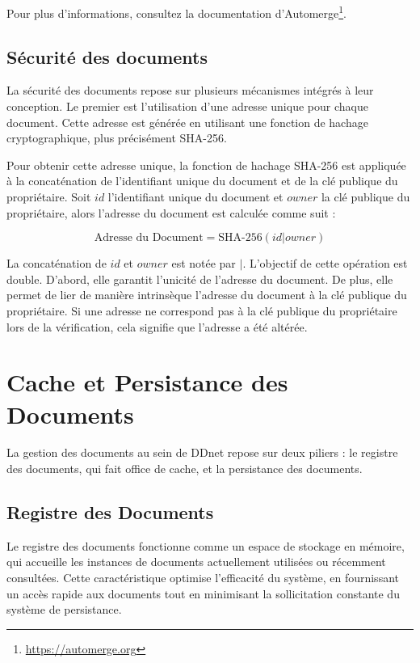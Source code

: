 Pour plus d'informations, consultez la documentation d'Automerge\footnote{\url{https://automerge.org}}.


\subsection{Sécurité des documents}

La sécurité des documents repose sur plusieurs mécanismes intégrés à leur conception. Le premier est l'utilisation d'une adresse unique pour chaque document. Cette adresse est générée en utilisant une fonction de hachage cryptographique, plus précisément SHA-256.

Pour obtenir cette adresse unique, la fonction de hachage SHA-256 est appliquée à la concaténation de l'identifiant unique du document et de la clé publique du propriétaire. Soit $id$ l'identifiant unique du document et $owner$ la clé publique du propriétaire, alors l'adresse du document est calculée comme suit :

\begin{equation}
    \text{Adresse du Document} = \text{SHA-256}(id | owner)
\end{equation}

La concaténation de $id$ et $owner$ est notée par \guillemotleft $|$\guillemotright. L'objectif de cette opération est double. D'abord, elle garantit l'unicité de l'adresse du document. De plus, elle permet de lier de manière intrinsèque l'adresse du document à la clé publique du propriétaire. Si une adresse ne correspond pas à la clé publique du propriétaire lors de la vérification, cela signifie que l'adresse a été altérée.

\section{Cache et Persistance des Documents}

La gestion des documents au sein de \gls{DDnet} repose sur deux piliers : le registre des documents, qui fait office de cache, et la persistance des documents.

\subsection{Registre des Documents}

Le registre des documents fonctionne comme un espace de stockage en mémoire, qui accueille les instances de documents actuellement utilisées ou récemment consultées. Cette caractéristique optimise l'efficacité du système, en fournissant un accès rapide aux documents tout en minimisant la sollicitation constante du système de persistance.

